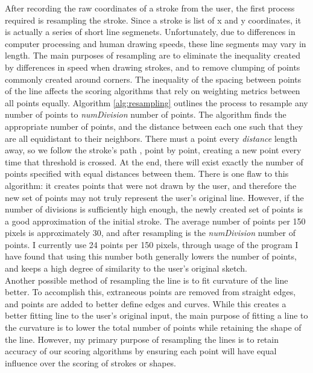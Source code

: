 After recording the raw coordinates of a stroke from the user, the first process required is resampling the stroke. Since a stroke is list of x and y coordinates, it is actually a series of short line segmenets. Unfortunately, due to differences in computer processing and human drawing speeds, these line segments may vary in length. The main purposes of resampling are to eliminate the inequality created by differences in speed when drawing strokes, and to remove clumping of points commonly created around corners. The inequality of the spacing between points of the line affects the scoring algorithms that rely on weighting metrics between all points equally. Algorithm \ref{alg:resampling} outlines the process to resample any number of points to \emph{numDivision} number of points. The algorithm finds the appropriate number of points, and the distance between each one such that they are all equidistant to their neighbors. There must a point every \emph{distance} length away, so we follow the stroke's path , point by point, creating a new point every time that threshold is crossed. At the end, there will exist exactly the number of points specified with equal distances between them. There is one flaw to this algorithm: it creates points that were not drawn by the user, and therefore the new set of points may not truly represent the user's original line. However, if the number of divisions is sufficiently high enough, the newly created set of points is a good approximation of the initial stroke. The average number of points per 150 pixels is approximately 30, and after resampling is the \emph{numDivision} number of points. I currently use 24 points per 150 pixels, through usage of the program I have found that using this number both generally lowers the number of points, and keeps a high degree of similarity to the user's original sketch.\\

Another possible method of resampling the line is to fit curvature of the line better. To accomplish this, extraneous points are removed from straight edges, and points are added to better define edges and curves. While this creates a better fitting line to the user's original input, the main purpose of fitting a line to the curvature is to lower the total number of points while retaining the shape of the line. However, my primary purpose of resampling the lines is to retain accuracy of our scoring algorithms by ensuring each point will have equal influence over the scoring of strokes or shapes.

